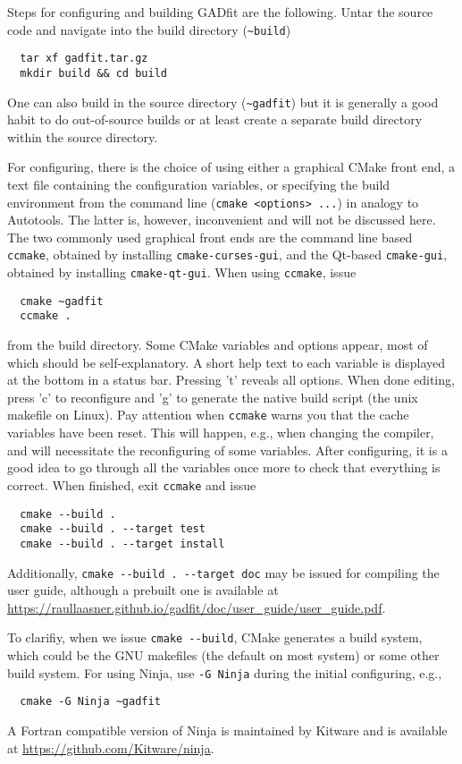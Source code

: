 \documentclass{article}
\begin{document}
Steps for configuring and building GADfit are the following. Untar the source code and navigate into the build directory (\verb+~build+)
\begin{verbatim}
  tar xf gadfit.tar.gz
  mkdir build && cd build
\end{verbatim}
One can also build in the source directory (\verb+~gadfit+) but it is generally a good habit to do out-of-source builds or at least create a separate build directory within the source directory.

For configuring, there is the choice of using either a graphical CMake front end, a text file containing the configuration variables, or specifying the build environment from the command line (\verb+cmake <options> ...+) in analogy to Autotools. The latter is, however, inconvenient and will not be discussed here. The two commonly used graphical front ends are the command line based \texttt{ccmake}, obtained by installing \texttt{cmake-curses-gui}, and the Qt-based \texttt{cmake-gui}, obtained by installing \texttt{cmake-qt-gui}. When using \texttt{ccmake}, issue
\begin{verbatim}
  cmake ~gadfit
  ccmake .
\end{verbatim}
from the build directory. Some CMake variables and options appear, most of which should be self-explanatory. A short help text to each variable is displayed at the bottom in a status bar. Pressing 't' reveals all options. When done editing, press 'c' to reconfigure and 'g' to generate the native build script (the unix makefile on Linux). Pay attention when \texttt{ccmake} warns you that the cache variables have been reset. This will happen, e.g., when changing the compiler, and will necessitate the reconfiguring of some variables. After configuring, it is a good idea to go through all the variables once more to check that everything is correct. When finished, exit \texttt{ccmake} and issue
\begin{verbatim}
  cmake --build .
  cmake --build . --target test
  cmake --build . --target install
\end{verbatim}
Additionally, \verb+cmake --build . --target doc+ may be issued for compiling the user guide, although a prebuilt one is available at \url{https://raullaasner.github.io/gadfit/doc/user_guide/user_guide.pdf}.

To clarifiy, when we issue \verb+cmake --build+, CMake generates a build system, which could be the GNU makefiles (the default on most system) or some other build system. For using Ninja, use \texttt{-G Ninja} during the initial configuring, e.g.,
\begin{verbatim}
  cmake -G Ninja ~gadfit
\end{verbatim}
A Fortran compatible version of Ninja is maintained by Kitware and is available at \url{https://github.com/Kitware/ninja}.
\end{document}
